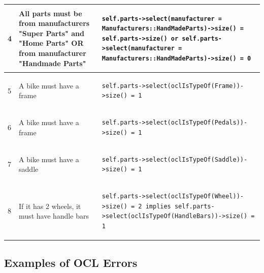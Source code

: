 \begin{table}[htp]
\begin{center}
\begin{tabular*}{\textwidth}{p{} p{}
	l{}}
4	&	All parts must be from manufacturers "Super Parts" and "Home Parts" OR from manufacturer "Handmade Parts" &
\begin{lstlisting}
self.parts->select(manufacturer = Manufacturers::HandMadeParts)->size() = self.parts->size() or self.parts->select(manufacturer = Manufacturers::HandMadeParts)->size() = 0
\end{lstlisting}  \\ \hline

5	&	A bike must have a frame &
\begin{lstlisting}
self.parts->select(oclIsTypeOf(Frame))->size() = 1
\end{lstlisting}  \\ \hline

6	&	A bike must have a frame &
\begin{lstlisting}
self.parts->select(oclIsTypeOf(Pedals))->size() = 1
\end{lstlisting}  \\ \hline

7	&	A bike must have a saddle &
\begin{lstlisting}
self.parts->select(oclIsTypeOf(Saddle))->size() = 1
\end{lstlisting}  \\ \hline

8	&	If it has 2 wheels, it must have handle bars &
\begin{lstlisting}
self.parts->select(oclIsTypeOf(Wheel))->size() = 2 implies self.parts->select(oclIsTypeOf(HandleBars))->size() = 1 
\end{lstlisting}  \\ \hline
	\end{tabular*}
\end{center}
\end{table}

\subsection{Examples of OCL Errors}

